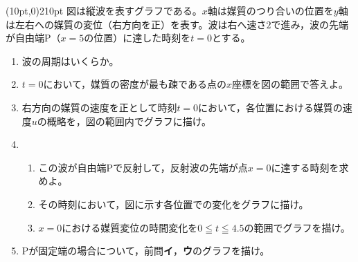 \hakosyokika
\item
    \begin{mawarikomi}(10pt,0){210pt}{}
        図は縦波を表すグラフである。$x$軸は媒質のつり合いの位置を$y$軸は左右への媒質の変位（右方向を正）を表す。波は右へ速さ$2$で進み，波の先端が自由端P（$x=5$の位置）に達した時刻を$t=0$とする。
        \begin{enumerate}
            \item 波の周期はいくらか。
            \item $t=0$において，媒質の密度が最も疎である点の$x$座標を図の範囲で答えよ。
            \item 右方向の媒質の速度を正として時刻$t=0$において，各位置における媒質の速度$u$の概略を，図の範囲内でグラフに描け。
            \item
                \begin{enumerate}
                    \item この波が自由端Pで反射して，反射波の先端が点$x=0$に達する時刻を求めよ。
                    \item その時刻において，図に示す各位置での変化をグラフに描け。
                    \item $x=0$における媒質変位の時間変化を$0\leqq t \leqq 4.5$の範囲でグラフを描け。
                \end{enumerate}
            \item Pが固定端の場合について，前問{\bf イ}，{\bf ウ}のグラフを描け。
        \end{enumerate}
    \end{mawarikomi}